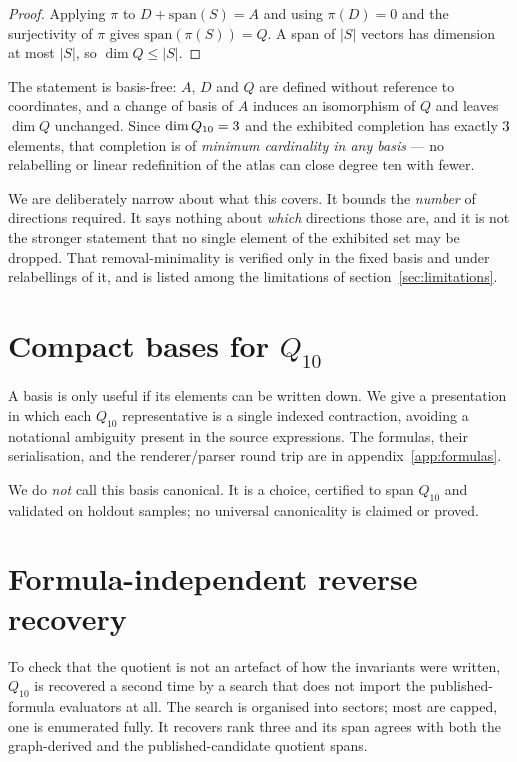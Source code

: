 \documentclass[11pt,a4paper]{article}
\begin{document}
\begin{proof}
Applying $\pi$ to $D+\mathrm{span}(S)=A$ and using $\pi(D)=0$ and the
surjectivity of $\pi$ gives $\mathrm{span}(\pi(S)) = Q$. A span of $|S|$ vectors
has dimension at most $|S|$, so $\dim Q \le |S|$.
\end{proof}

The statement is basis-free: $A$, $D$ and $Q$ are defined without reference to
coordinates, and a change of basis of $A$ induces an isomorphism of $Q$ and
leaves $\dim Q$ unchanged. Since $\dim Q_{10} = 3$ and the exhibited
completion has exactly $3$ elements, that completion is of \emph{minimum
cardinality in any basis} --- no relabelling or linear redefinition of the atlas
can close degree ten with fewer.

We are deliberately narrow about what this covers. It bounds the \emph{number} of
directions required. It says nothing about \emph{which} directions those are, and
it is not the stronger statement that no single element of the exhibited set may
be dropped. That removal-minimality is verified only in the fixed basis and under
relabellings of it, and is listed among the limitations of
section~\ref{sec:limitations}.

\section{Compact bases for $Q_{10}$}
\label{sec:pureN}

A basis is only useful if its elements can be written down. We give a
presentation in which each $Q_{10}$ representative is a single indexed
contraction, avoiding a notational ambiguity present in the source expressions.
The formulas, their serialisation, and the renderer/parser round trip are in
appendix~\ref{app:formulas}.

We do \emph{not} call this basis canonical. It is a choice, certified to span
$Q_{10}$ and validated on holdout samples; no universal canonicality is claimed
or proved.

\section{Formula-independent reverse recovery}
\label{sec:reverse}

To check that the quotient is not an artefact of how the invariants were
written, $Q_{10}$ is recovered a second time by a search that does not import the
published-formula evaluators at all. The search is organised into sectors; most
are capped, one is enumerated fully. It recovers rank three and its span agrees
with both the graph-derived and the published-candidate quotient spans.
\end{document}
